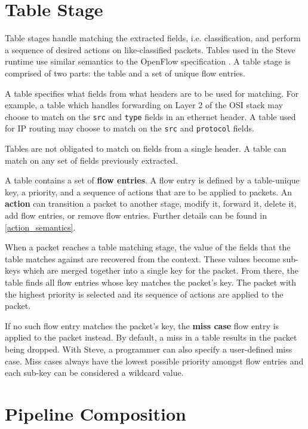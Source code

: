\section{Table Stage} \label{table_desc}

Table stages handle matching the extracted fields, i.e. classification, and perform a sequence of desired actions on like-classified packets. Tables used in the Steve runtime use similar semantics to the OpenFlow specification \cite{openflow_spec}. A table stage is comprised of two parts: the table and a set of unique flow entries.

A table specifies what fields from what headers are to be used for matching. For example, a table which handles forwarding on Layer 2 of the OSI stack may choose to match on the \texttt{src} and \texttt{type} fields in an ethernet header. A table used for IP routing may choose to match on the \texttt{src} and \texttt{protocol} fields. 

Tables are not obligated to match on fields from a single header. A table can match on any set of fields previously extracted.

A table contains a set of \textbf{flow entries}. A flow entry is defined by a table-unique key, a priority, and a sequence of actions that are to be applied to packets. An \textbf{action} can transition a packet to another stage, modify it, forward it, delete it, add flow entries, or remove flow entries. Further details can be found in \ref{action_semantics}.

When a packet reaches a table matching stage, the value of the fields that the table matches against are recovered from the context. These values become sub-keys which are merged together into a single key for the packet. From there, the table finds all flow entries whose key matches the packet's key. The packet with the highest priority is selected and its sequence of actions are applied to the packet.

If no such flow entry matches the packet's key, the \textbf{miss case} flow entry is applied to the packet instead. By default, a miss in a table results in the packet being dropped. With Steve, a programmer can also specify a user-defined miss case. Miss cases always have the lowest possible priority amongst flow entries and each sub-key can be considered a wildcard value.


\section{Pipeline Composition} \label{pipeline_comp_desc}

